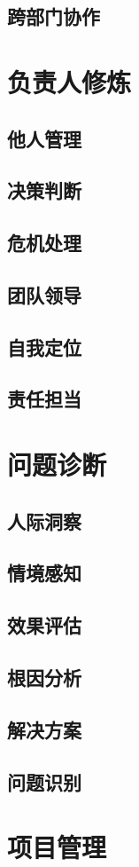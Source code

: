 \documentclass[openany,10pt,UTF8]{ctexbook}
\begin{document}
\chapter{跨部门协作}


\part{负责人修炼}
\chapter{他人管理}

\chapter{决策判断}

\chapter{危机处理}

\chapter{团队领导}

\chapter{自我定位}

\chapter{责任担当}


\part{问题诊断}
\chapter{人际洞察}

\chapter{情境感知}

\chapter{效果评估}

\chapter{根因分析}

\chapter{解决方案}

\chapter{问题识别}


\part{项目管理}
\end{document}

